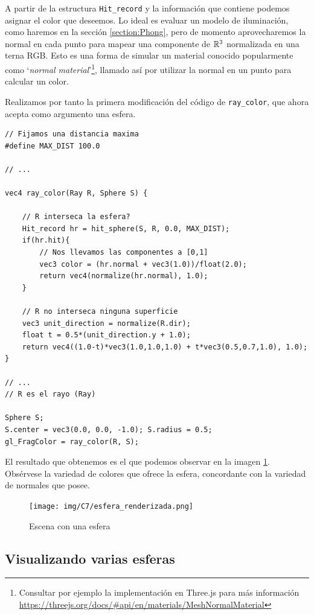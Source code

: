A partir de la estructura \verb|Hit_record| y la información que contiene podemos asignar el color que deseemos. Lo ideal es evaluar un modelo de iluminación, como haremos en la sección \ref{section:Phong}, pero de momento aprovecharemos la normal en cada punto para mapear una componente de $\mathbb{R}^3$ normalizada en una terna RGB. Esto es una forma de simular un material conocido popularmente como `\textit{normal material}'\footnote{Consultar por ejemplo la implementación en Three.js para más información \url{https://threejs.org/docs/\#api/en/materials/MeshNormalMaterial}}, llamado así por utilizar la normal en un punto para calcular un color.

Realizamos por tanto la primera modificación del código de \verb|ray_color|, que ahora acepta como argumento una esfera.

\begin{lstlisting}
// Fijamos una distancia maxima
#define MAX_DIST 100.0

// ... 

vec4 ray_color(Ray R, Sphere S) {

    // R interseca la esfera?
    Hit_record hr = hit_sphere(S, R, 0.0, MAX_DIST);
    if(hr.hit){
        // Nos llevamos las componentes a [0,1]
        vec3 color = (hr.normal + vec3(1.0))/float(2.0);
        return vec4(normalize(hr.normal), 1.0);
    }

    // R no interseca ninguna superficie
    vec3 unit_direction = normalize(R.dir);
    float t = 0.5*(unit_direction.y + 1.0);
    return vec4((1.0-t)*vec3(1.0,1.0,1.0) + t*vec3(0.5,0.7,1.0), 1.0);
}

// ... 
// R es el rayo (Ray)

Sphere S; 
S.center = vec3(0.0, 0.0, -1.0); S.radius = 0.5;
gl_FragColor = ray_color(R, S);
\end{lstlisting}

El resultado que obtenemos es el que podemos observar en la imagen \ref{fig:una-esfera}. Obsérvese la variedad de colores que ofrece la esfera, concordante con la variedad de normales que posee.

\begin{figure} [ht]
    \centering
    \texttt{[image: img/C7/esfera\_renderizada.png]}
    \caption{Escena con una esfera}
    \label{fig:una-esfera}
\end{figure}

\subsection{Visualizando varias esferas}

